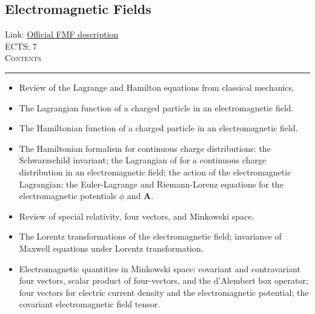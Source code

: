 \documentclass[11pt, a4paper]{article}
\newenvironment{course}[3]{
\subsection{#1}%
Link: \href{#2}{Official FMF description}\\%
ECTS: #3%
\vspace{1ex}
\\
{\large \textsc{Contents}}\\[-0.9ex]%
\rule{\textwidth}{0.5pt}
\vspace{-3ex}
}
{}
\newenvironment{chapter}[1]{
\begin{tcolorbox}[title=#1, breakable]
}
{\end{tcolorbox}}
\begin{document}
\begin{course}{Electromagnetic Fields}{https://www.fmf.uni-lj.si/en/study-physics/programmes/1fiz/2020/7000777/courses/1133/}{7}
\begin{chapter}{Frequency dependence of the dielectric function}
\begin{itemize}
        \end{itemize}
    \end{chapter}

    \begin{chapter}{Introduction to the Hamiltonian formalism for electromagnetism}

        \begin{itemize}
        
            \item Review of the Lagrange and Hamilton equations from classical mechanics.

            \item The Lagrangian function of a charged particle in an electromagnetic field.

            \item The Hamiltonian function of a charged particle in an electromagnetic field.

            \item The Hamiltonian formalism for continuous charge distributions: the Schwarzschild invariant; the Lagrangian of for a continuous charge distribution in an electromagnetic field; the action of the electromagnetic Lagrangian; the Euler-Lagrange and Riemann-Lorenz equations for the electromagnetic potentials $ \phi $ and $ \bm{A} $.
        
        \end{itemize}
        
    \end{chapter}

    \begin{chapter}{Introduction to relativistic electromagnetism}
        \begin{itemize}
        
            \item Review of special relativity, four vectors, and Minkowski space.

            \item The Lorentz transformations of the electromagnetic field; invariance of Maxwell equations under Lorentz transformation.

            \item Electromagnetic quantities in Minkowski space: covariant and contravariant four vectors, scalar product of four-vectors, and the d'Alembert box operator; four vectors for electric current density and the electromagnetic potential; the covariant electromagnetic field tensor.
        
        \end{itemize}
    \end{chapter}

\end{course}
\end{document}

